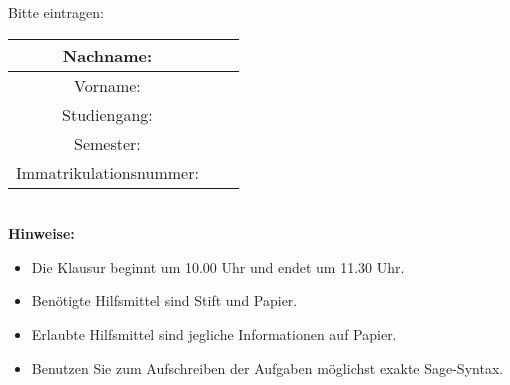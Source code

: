 \bigskip\bigskip\bigskip
Bitte eintragen:\\
\begin{center}
\begin{tabular}{|Sl|p{8cm}|}
\hline
Nachname: & \\
\hline
Vorname: & \\
\hline
Studiengang: & \\
\hline 
Semester: & \\
\hline 
Immatrikulationsnummer: & \\
\hline
\end{tabular}\\[1cm]
\textbf{Hinweise:}
\begin{itemize}
\item Die Klausur beginnt um 10.00 Uhr und endet um 11.30 Uhr.
\item Benötigte Hilfsmittel sind Stift und Papier.
\item Erlaubte Hilfsmittel sind jegliche Informationen auf Papier. 
\item Benutzen Sie zum Aufschreiben der Aufgaben möglichst exakte Sage-Syntax. %
\end{itemize}
\end{center}

\newpage
\normalsize
